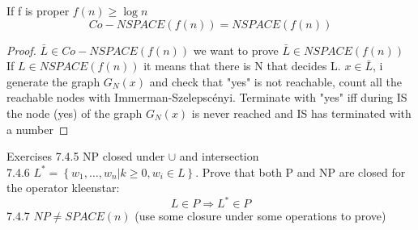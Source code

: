 \begin{corollary}
    If f is proper $f(n) \geq \log{n}$ 
    \[ 
        Co-NSPACE(f(n)) = NSPACE(f(n)) 
    \]
    \begin{proof}
        $\bar{L} \in Co-NSPACE(f(n))$ we want to prove $\bar{L} \in NSPACE(f(n))$
        If $L \in NSPACE(f(n))$ it means that there is N that decides L. $x \in \bar{L}$, i generate the graph $G_N(x)$ and check that "yes" is not reachable, count all the reachable nodes with Immerman-Szelepscényi. Terminate with "yes" iff during IS the node (yes) of the graph $G_N(x)$ is never reached and IS has terminated with a number
    \end{proof}
\end{corollary}
Exercises
7.4.5 NP closed under $\cup$ and intersection\\
7.4.6 $L^* = \left\{ w_{1}, \ldots,w_{n} | k\geq 0 , w_i \in L \right\}$. Prove that both P and NP are closed for the operator kleenstar:
\[ 
    L \in P \Rightarrow L^* \in P 
\]
7.4.7 $NP \neq SPACE(n)$ (use some closure under some operations to prove)\\

